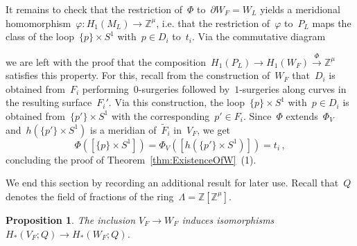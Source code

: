 \documentclass[10.9pt,a4paper]{amsart}
\newtheorem{proposition}[theorem]{Proposition}
\theoremstyle{definition}
\theoremstyle{remark}
\newcommand{\Z}{\mathbb{Z}}
\begin{document}
It remains to check that the restriction of~$\Phi$ to~$\partial W_F=W_L$ yields a meridional homomorphism~$\varphi\colon H_1(M_L)\to\Z^\mu$, i.e.
that the restriction of~$\varphi$ to~$P_L$
maps the class of the loop~$\{p\}\times S^1$ with~$p\in D_i$ to~$t_i$. Via the commutative diagram
\begin{center}
\end{center}
we are left with the proof that the composition~$H_1(P_L)\to H_1(W_F) \stackrel{\Phi}{\to} \Z^{\mu}$ satisfies this property.
For this, recall from the construction of~$W_F$ that~$D_i$ is obtained from~$F_i$ performing~$0$-surgeries
followed by~$1$-surgeries along curves in the resulting surface~$F_i'$. Via this construction, the loop~$\{p\} \times S^1$ with~$p\in D_i$ is obtained from~$\{p'\} \times S^1$ with the corresponding~$p'\in F_i$. Since~$\Phi$ extends~$\Phi_V$ and~$h(\{p'\} \times S^1)$ is a meridian of~$\tilde F_i$ in~$V_F$, we get
\[
\Phi([\{p\} \times S^1]) = \Phi_V([h(\{p'\} \times S^1)]) = t_i\,,
\]
concluding the proof of Theorem~\ref{thm:ExistenceOfW}~(1).

\medskip

We end this section by recording an additional result for later use. Recall that~$Q$ denotes the field of fractions
of the ring~$\Lambda=\Z[\Z^\mu]$.

\begin{proposition}
\label{lem:V-WoverQ}
The inclusion $V_F \to W_F$ induces isomorphisms~$H_*(V_F; Q) \to H_*(W_F; Q)$.
\end{proposition}
\end{document}
